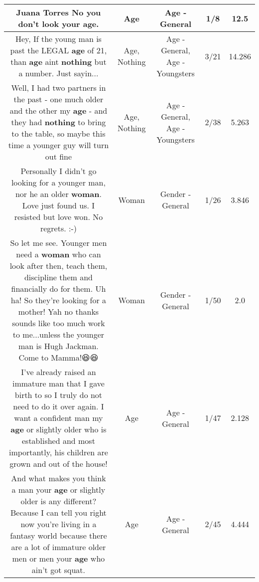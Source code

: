 \documentclass[11pt]{article}
\newlength\mylength
\begin{document}
\begin{center}
\begin{longtable}{|C{.65\mylength}|C{.30\mylength}|C{.12\mylength}|C{.12\mylength}|C{.12\mylength}|}
  \small Juana Torres No you don't look your \textbf{age}.\normalsize   & Age & Age - General & 1/8 & 12.5 \\  \hline
  \small Hey, If the young man is past the LEGAL \textbf{age} of 21, than \textbf{age} aint \textbf{nothing} but a number. Just sayin...\normalsize   & Age, Nothing & Age - General, Age - Youngsters & 3/21 & 14.286 \\  \hline
  \small Well, I had two partners in the past - one much older and the other my \textbf{age} - and they had \textbf{nothing} to bring to the table, so maybe this time a younger guy will turn out fine\normalsize   & Age, Nothing & Age - General, Age - Youngsters & 2/38 & 5.263 \\  \hline
  \small Personally I didn't go looking for a younger man, nor he an older \textbf{woman}. Love just found us. I resisted but love won. No regrets. :-)\normalsize   & Woman & Gender - General & 1/26 & 3.846 \\  \hline
  \small So let me see. Younger men need a \textbf{woman} who can look after then, teach them, discipline them and financially do for them.   Uh ha! So they're looking for a mother! Yah no thanks sounds like too much work to me...unless the younger man is Hugh Jackman. Come to Mamma!😆😆\normalsize   & Woman & Gender - General & 1/50 & 2.0 \\  \hline
  \small I've already raised an immature man that I gave birth to so I truly do not need to do it over again. I want a confident man my \textbf{age} or slightly older who is established and most importantly, his children are grown and out of the house!\normalsize   & Age & Age - General & 1/47 & 2.128 \\  \hline
  \small And what makes you think a man your \textbf{age} or slightly older is any different? Because I can tell you right now you're living in a fantasy world because there are a lot of immature older men or men your \textbf{age} who ain't got squat.\normalsize   & Age & Age - General & 2/45 & 4.444 \\  \hline

\end{longtable}
\end{center}
\end{document}
